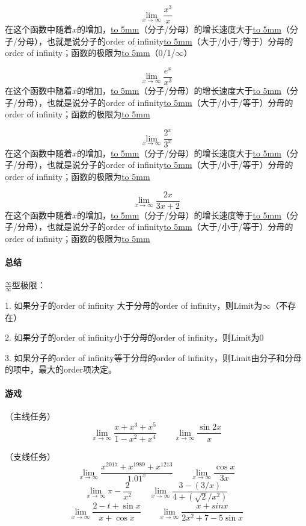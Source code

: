 \documentclass[UTF8]{ctexart}
\begin{document}
\[ {\lim_{x \to \infty} \frac{x^3}{x}}\]
在这个函数中随着$x$的增加，\underline{\hbox to 5mm{}}（分子/分母）的增长速度大于\underline{\hbox to 5mm{}}（分子/分母），也就是说分子的order of infinity\underline{\hbox to 5mm{}}（大于/小于/等于）分母的order of infinity；函数的极限为\underline{\hbox to 5mm{}}（0/1/$\infty$）

\[ {\lim_{x \to \infty} \frac{e^x}{x^3}}\]
在这个函数中随着$x$的增加，\underline{\hbox to 5mm{}}（分子/分母）的增长速度大于\underline{\hbox to 5mm{}}（分子/分母），也就是说分子的order of infinity\underline{\hbox to 5mm{}}（大于/小于/等于）分母的order of infinity；函数的极限为\underline{\hbox to 5mm{}}

\[ {\lim_{x \to \infty} \frac{2^x}{3^x}}\]
在这个函数中随着$x$的增加，\underline{\hbox to 5mm{}}（分子/分母）的增长速度大于\underline{\hbox to 5mm{}}（分子/分母），也就是说分子的order of infinity\underline{\hbox to 5mm{}}（大于/小于/等于）分母的order of infinity；函数的极限为\underline{\hbox to 5mm{}}

\[ {\lim_{x \to \infty} \frac{2x}{3x+2}}\]
在这个函数中随着$x$的增加，\underline{\hbox to 5mm{}}（分子/分母）的增长速度等于\underline{\hbox to 5mm{}}（分子/分母），也就是说分子的order of infinity\underline{\hbox to 5mm{}}（大于/小于/等于）分母的order of infinity；函数的极限为\underline{\hbox to 5mm{}}

\paragraph{总结}
$\frac{\infty}{\infty}$型极限：

1. 如果分子的order of infinity 大于分母的order of infinity，则Limit为$\infty$（不存在）

2. 如果分子的order of infinity小于分母的order of infinity，则Limit为0

3. 如果分子的order of infinity等于分母的order of infinity，则Limit由分子和分母的项中，最大的order项决定。

\paragraph{游戏}

（主线任务）
\[{\lim_{x \to \infty} \frac{x+x^3+x^5}{1-x^2+x^4}}  \qquad  {\lim_{x \to \infty} \frac{\sin{2x}}{x}} \]

（支线任务）
\[{\lim_{x \to \infty} \frac{x^{2017}+x^{1989}+x^{1213}}{1.01^x}}  \qquad  {\lim_{x \to \infty} \frac{\cos{x}}{3x}} \]
\[{\lim_{x \to \infty} \pi - \frac{2}{x^2}}  \qquad  {\lim_{x \to \infty} \frac{3-(3/x)}{4+(\sqrt{2}/x^2)}} \]
\[{\lim_{x \to \infty} \frac{2-t+\sin{x}}{x+\cos{x}}}  \qquad  {\lim_{x \to \infty} \frac{x+sinx}{2x^2+7-5\sin{x}}} \]
\end{document}
